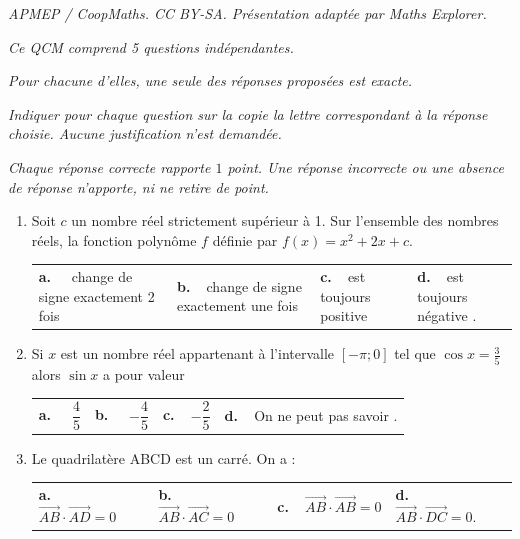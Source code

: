\documentclass[10pt]{article}
\providecommand{\vv}[1]{\overrightarrow{#1}}
\providecommand{\vv}[1]{{\overrightarrow{#1}}}
\begin{document}
\noindent\textit{APMEP / CoopMaths. CC BY-SA. Présentation adaptée par Maths Explorer.}\par\medskip
\medskip

\emph{Ce QCM comprend 5 questions indépendantes.}

\emph{Pour chacune d'elles, une seule des réponses proposées est exacte.}

\emph{Indiquer pour chaque question sur la copie la lettre correspondant à la réponse
choisie. Aucune justification n'est demandée.}

\emph{Chaque réponse correcte rapporte $1$ point. Une réponse incorrecte ou une absence de
réponse n'apporte, ni ne retire de point.}

\medskip

\begin{enumerate}
\item  Soit $c$ un nombre réel strictement supérieur à 1. Sur l'ensemble des nombres réels, la
fonction polynôme $f$ définie par $f(x) = x^2 + 2x + c$.

\begin{center}
\begin{tabularx}{\linewidth}{*{4}{X}}
\textbf{a.~~}  change de signe exactement 2 fois &\textbf{b.~~}change de signe exactement une fois &\textbf{c.~~}est toujours positive& \textbf{d.~~}est toujours négative .
\end{tabularx}
\end{center}
\item Si $x$ est un nombre réel appartenant à l'intervalle $[ - \pi ; 0] $ tel que $\cos x =\frac{3}{5}$
 alors $\sin x$ a pour valeur 

\begin{center}
\begin{tabularx}{\linewidth}{*{4}{X}}
\textbf{a.~~} $\dfrac{4}{5}$ &\textbf{b.~~} $-\dfrac{4}{5}$&\textbf{c.~~}$ -\dfrac{2}{5}$& \textbf{d.~~}On ne peut pas savoir .
\end{tabularx}
\end{center}

\item Le quadrilatère ABCD est un carré. On a :

\begin{center}
\begin{tabularx}{\linewidth}{*{4}{X}}
\textbf{a.~~} $\vv{AB}\cdot\vv{AD}= 0$ &\textbf{b.~~} $\vv{AB}\cdot\vv{AC}= 0$&\textbf{c.~~}$ \vv{AB}\cdot\vv{AB}= 0$& \textbf{d.~~} $\vv{AB}\cdot\vv{DC} = 0$.
\end{tabularx}
\end{center}



\end{enumerate}
\end{document}
